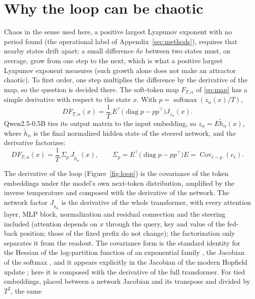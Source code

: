 \documentclass[11pt,letterpaper]{article}
\begin{document}
\section{Why the loop can be chaotic}
\label{sec:theory}
Chaos in the sense used here, a positive largest Lyapunov exponent with no period found (the operational label of
Appendix~\ref{sec:methods}), requires that nearby states drift apart: a small difference $\delta x$ between two states must, on average, grow
from one step to the next, which is what a positive largest Lyapunov exponent measures (such growth alone does not
make an attractor chaotic). To first order, one step multiplies the difference by the derivative of the map, so the
question is decided there. The soft-token map $F_{T,\alpha}$ of \eqref{eq:map} has a simple derivative with respect to
the state $x$. With $p=\operatorname{softmax}(z_\alpha(x)/T)$,
\begin{equation}
DF_{T,\alpha}(x)=\frac{1}{T}\,E^{\top}\bigl(\operatorname{diag}p-pp^{\top}\bigr)J_{z_\alpha}(x).
\end{equation}
Qwen2.5-0.5B ties its output matrix to the input embedding, so $z_\alpha=E\tilde h_\alpha(x)$, where $\tilde h_\alpha$
is the final normalized hidden state of the steered network, and the derivative factorizes:
\begin{equation}
DF_{T,\alpha}(x)=\frac{1}{T}\,\Sigma_p\,J_{\tilde h_\alpha}(x),\qquad
\Sigma_p=E^{\top}\bigl(\operatorname{diag}p-pp^{\top}\bigr)E=\operatorname{Cov}_{t\sim p}(e_t).
\label{eq:gain}
\end{equation}

The derivative of the loop (Figure~\ref{fig:loop}) is the covariance of the token embeddings under the model's own next-token distribution,
amplified by the inverse temperature and composed with the derivative of the network. The network factor
$J_{\tilde h_\alpha}$ is the derivative of the whole transformer, with every attention layer, MLP block, normalization
and residual connection and the steering included (attention depends on $x$ through the query, key and value of the
fed-back position; those of the fixed prefix do not change); the factorization only separates it from the readout.
The covariance form is the standard identity for the Hessian of the log-partition function of an exponential family
\cite{wainwright2008graphical}, the Jacobian of the softmax \cite{gao2017softmax}, and it appears explicitly in the
Jacobian of the modern Hopfield update \cite{ramsauer2020hopfield}; here it is composed with the derivative of the full
transformer. For tied embeddings, placed between a network Jacobian and its transpose and divided by $T^2$, the same
\end{document}
